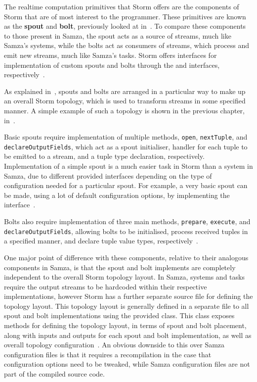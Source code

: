 The realtime computation primitives that Storm offers are the components of Storm that are of most interest to the programmer.
These primitives are known as the \textbf{spout} and \textbf{bolt}, previously looked at in~. To compare
these components to those present in Samza, the spout acts as a source of streams, much like Samza's systems, while the
bolts act as consumers of streams, which process and emit new streams, much like Samza's tasks. Storm offers interfaces
for implementation of custom spouts and bolts through the  and 
interfaces, respectively~\cite{storm_doc}.

As explained in~, spouts and bolts are arranged in a particular way to make up an overall Storm topology,
which is used to transform streams in some specified manner. A simple example of such a topology is shown in the previous
chapter, in~.

Basic spouts require implementation of multiple methods, \texttt{open}, \texttt{nextTuple}, and \texttt{declareOutputFields},
which act as a spout initialiser, handler for each tuple to be emitted to a stream, and a tuple type declaration, respectively.
Implementation of a simple spout is a much easier task in Storm than a system in Samza, due to different provided interfaces
depending on the type of configuration needed for a particular spout. For example, a very basic spout can be made, using
a lot of default configuration options, by implementing the  interface~\cite{storm_doc}.

Bolts also require implementation of three main methods, \texttt{prepare}, \texttt{execute}, and \texttt{declareOutputFields},
allowing bolts to be initialised, process received tuples in a specified manner, and declare tuple value types, respectively~\cite{storm_doc}.

One major point of difference with these components, relative to their analogous components in Samza, is that the spout and bolt
implements are completely independent to the overall Storm topology layout. In Samza, systems and tasks require the output
streams to be hardcoded within their respective implementations, however Storm has a further separate source file for
defining the topology layout. This topology layout is generally defined in a separate file to all spout and bolt implementations
using the provided  class. This class exposes methods for defining the
topology layout, in terms of spout and bolt placement, along with inputs and outputs for each spout and bolt implementation,
as well as overall topology configuration~\cite{storm_doc}. An obvious downside to this over Samza configuration files is that it requires
a recompilation in the case that configuration options need to be tweaked, while Samza configuration files are not part
of the compiled source code.

